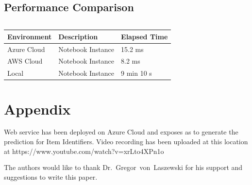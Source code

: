 \subsection{Performance Comparison}
\begin{verbatim}

\end{verbatim}
\begin{tabular}{|l|l|l|}
\hline
Environment &   Description    &     Elapsed Time \\
\hline
Azure Cloud &   Notebook Instance  & 15.2 ms \\
\hline
AWS Cloud &   Notebook Instance  & 8.2 ms \\
\hline
Local &   Notebook Instance  & 9 min 10 s \\
\hline
\end{tabular}


\section{Appendix}

Web service has been deployed on Azure Cloud and exposes as to generate 
the prediction for Item Identifiers.
Video recording has been uploaded at this location at 
https://www.youtube.com/watch?v=xrLto4XPn1o

\begin{acks}

  The authors would like to thank Dr.~Gregor~von~Laszewski for his
  support and suggestions to write this paper.

\end{acks}


 
